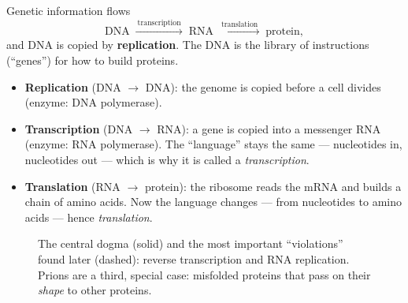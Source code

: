 \documentclass[11pt, oneside]{book}
\begin{document}
\begin{defbox}[title={Central dogma of molecular biology}]
Genetic information flows
\[
  \text{DNA} \;\xrightarrow{\ \text{transcription}\ }\; \text{RNA}
  \;\xrightarrow{\ \text{translation}\ }\; \text{protein},
\]
and DNA is copied by \textbf{replication}. The DNA is the library of
instructions (``genes'') for how to build proteins.
\begin{itemize}
  \item \textbf{Replication} (DNA $\to$ DNA): the genome is copied before a cell
    divides (enzyme: DNA polymerase).
  \item \textbf{Transcription} (DNA $\to$ RNA): a gene is copied into a
    messenger RNA (enzyme: RNA polymerase). The ``language'' stays the same ---
    nucleotides in, nucleotides out --- which is why it is called a
    \emph{transcription}.
  \item \textbf{Translation} (RNA $\to$ protein): the ribosome reads the mRNA
    and builds a chain of amino acids. Now the language changes --- from
    nucleotides to amino acids --- hence \emph{translation}.
\end{itemize}
\end{defbox}

\begin{figure}[htbp]
\centering
{}
\caption{The central dogma (solid) and the most important ``violations''
found later (dashed): reverse transcription and RNA replication. Prions are
a third, special case: misfolded proteins that pass on their \emph{shape}
to other proteins.}
\label{fig:central-dogma}
\end{figure}
\end{document}
